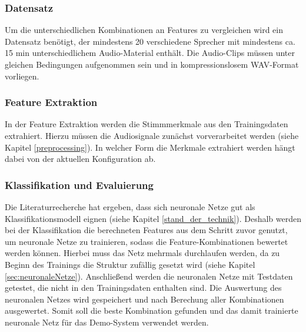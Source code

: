


\subsubsection{Datensatz}

Um die unterschiedlichen Kombinationen an Features zu vergleichen wird ein Datensatz benötigt, der mindestens 20 verschiedene Sprecher mit mindestens ca. 15 min unterschiedlichem Audio-Material enthält.
Die Audio-Clips müssen unter gleichen Bedingungen aufgenommen sein und in kompressionslosem WAV-Format vorliegen.

\subsubsection{Feature Extraktion}

In der Feature Extraktion werden die Stimmmerkmale aus den Trainingsdaten extrahiert.
Hierzu müssen die Audiosignale zunächst vorverarbeitet werden (siehe Kapitel \ref{preprocessing}).
In welcher Form die Merkmale extrahiert werden hängt dabei von der aktuellen Konfiguration ab.

\subsubsection{Klassifikation und Evaluierung}

Die Literaturrecherche hat ergeben, dass sich neuronale Netze gut als Klassifikationsmodell eignen (siehe Kapitel \ref{stand_der_technik}). 
Deshalb werden bei der Klassifikation die berechneten Features aus dem Schritt zuvor genutzt, um neuronale Netze zu trainieren, sodass die Feature-Kombinationen bewertet werden können.
Hierbei muss das Netz mehrmals durchlaufen werden, da zu Beginn des Trainings die Struktur zufällig gesetzt wird (siehe Kapitel \ref{sec:neuronaleNetze}).
Anschließend werden die neuronalen Netze mit Testdaten getestet, die nicht in den Trainingsdaten enthalten sind.
Die Auswertung des neuronalen Netzes wird gespeichert und nach Berechung aller Kombinationen ausgewertet.
Somit soll die beste Kombination gefunden und das damit trainierte neuronale Netz für das Demo-System verwendet werden.

